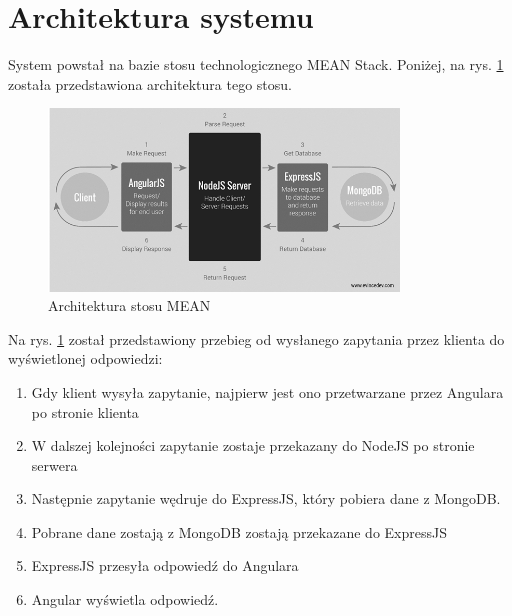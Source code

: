 \section{Architektura systemu}

System powstał na bazie stosu technologicznego MEAN Stack. Poniżej, na rys. \ref{sec:meanStackArchitecture} została przedstawiona architektura tego stosu.

\begin{figure}[h]
\caption{Architektura stosu MEAN}
\label{sec:meanStackArchitecture}
\centering
\includegraphics[width=0.83\textwidth]{meanArchitecture}
\end{figure}

\newpage
Na rys. \ref{sec:meanStackArchitecture} został przedstawiony przebieg od wysłanego zapytania przez klienta do wyświetlonej odpowiedzi:  
\begin{enumerate}
\item Gdy klient wysyła zapytanie, najpierw jest ono przetwarzane przez Angulara po stronie klienta
\item W dalszej kolejności zapytanie zostaje przekazany do NodeJS po stronie serwera
\item Następnie zapytanie wędruje do ExpressJS, który pobiera dane z MongoDB.
\item Pobrane dane zostają z MongoDB zostają przekazane do ExpressJS
\item ExpressJS przesyła odpowiedź do Angulara
\item Angular wyświetla odpowiedź.
\end{enumerate}
